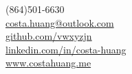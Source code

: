 \documentclass[margin,line]{resume}
\begin{document}
{
	\sc
    \hfill (864)501-6630                  \vspace{0mm}\\\vspace{0mm}%
    \hfill \href{mailto:costa.huang@outlook.com}{costa.huang@outlook.com}           \vspace{0mm}\\\vspace{0mm}%
    \hfill \href{https://github.com/vwxyzjn}{github.com/vwxyzjn}           \vspace{0mm}\\\vspace{0mm}%
    \hfill \href{http://linkedin.com/in/costa-huang}{linkedin.com/in/costa-huang}           \vspace{0mm}\\\vspace{0mm}%
    \hfill \href{https://costahuang.me/}{www.costahuang.me}               \vspace{0mm}\\\vspace{-10mm}%
}
\end{document}
